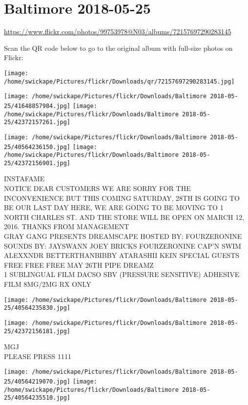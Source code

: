 \documentclass[10pt,letterpaper]{article}
\title{}
\author{}
\date{}
\begin{document}
\section*{Baltimore 2018-05-25}

\url{https://www.flickr.com/photos/99753978@N03/albums/72157697290283145}

Scan the QR code below to go to the original album with full-size photos on Flickr:

\texttt{[image: /home/swickape/Pictures/flickr/Downloads/qr/72157697290283145.jpg]}
\pagebreak

\texttt{[image: /home/swickape/Pictures/flickr/Downloads/Baltimore 2018-05-25/41648857984.jpg]}
\texttt{[image: /home/swickape/Pictures/flickr/Downloads/Baltimore 2018-05-25/42372157261.jpg]}

\texttt{[image: /home/swickape/Pictures/flickr/Downloads/Baltimore 2018-05-25/40564236150.jpg]}
\texttt{[image: /home/swickape/Pictures/flickr/Downloads/Baltimore 2018-05-25/42372156901.jpg]}

INSTAFAME\\
NOTICE DEAR CUSTOMERS WE ARE SORRY FOR THE INCONVENIENCE BUT THIS COMING SATURDAY, 28TH IS GOING TO BE OUR LAST DAY HERE, WE ARE GOING TO BE MOVING TO 1 NORTH CHARLES ST. AND THE STORE WILL BE OPEN ON MARCH 12, 2016.  THANKS FROM MANAGEMENT\\
GRAY GANG PRESENTS DREAMSCAPE HOSTED BY: FOURZERONINE SOUNDS BY: JAYSWANN JOEY BRICKS FOURZERONINE CAP'N SWIM ALEXXNDR BETTERTHANBIBBY ATARASHII KEIN SPECIAL GUESTS FREE FREE FREE MAY 26TH PIPE DREAMZ\\
1 SUBLINGUAL FILM DACSO SBV (PRESSURE SENSITIVE) ADHESIVE FILM 8MG/2MG RX ONLY
\pagebreak

\texttt{[image: /home/swickape/Pictures/flickr/Downloads/Baltimore 2018-05-25/40564235830.jpg]}

\vspace{0.25in}
\texttt{[image: /home/swickape/Pictures/flickr/Downloads/Baltimore 2018-05-25/42372156181.jpg]}

MGJ\\
PLEASE PRESS 1111
\pagebreak

\texttt{[image: /home/swickape/Pictures/flickr/Downloads/Baltimore 2018-05-25/40564219070.jpg]}
\texttt{[image: /home/swickape/Pictures/flickr/Downloads/Baltimore 2018-05-25/40564235510.jpg]}
\end{document}
